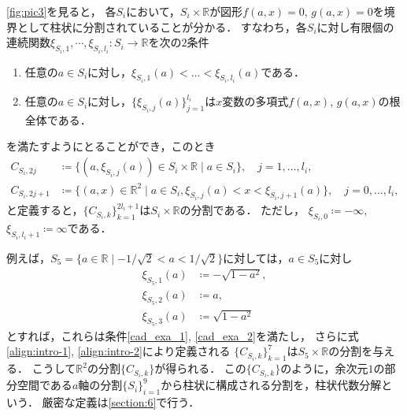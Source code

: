 \documentclass[uplatex, dvipdfmx]{jsarticle}
\numberwithin{equation}{section}
\newcommand{\R}{\mathbb{R}}
\newcommand{\map}[3]{{#1}\colon{#2}\rightarrow{#3}}
\theoremstyle{definition}
\begin{document}
     \cref{fig:pic3}を見ると，
     各$S_i$において，$S_i \times \R$が図形$f(a,x)=0$, $g(a,x)=0$を境界として柱状に分割されていることが分かる．
     すなわち，各$S_i$に対し有限個の連続関数$\map{\xi_{S_i,1}, \cdots, \xi_{S_i,l_i}}{S_i}{\R}$を次の$2$条件
     \begin{enumerate}
          \item 任意の$a \in S_i$に対し，$\xi_{S_i,1}(a) < \dots < \xi_{S_i,l_i}(a)$である．\label{cad_exa_1}
          \item 任意の$a \in S_i$に対し，$\{\xi_{S_i,j}(a)\}_{j=1}^{l_i}$は$x$変数の多項式$f(a,x)$, $g(a,x)$の根全体である．\label{cad_exa_2}
     \end{enumerate}
     を満たすようにとることができ，このとき
     \begin{align}
          \label{align:intro-1} C_{S_i, 2j} &\coloneqq \{(a,\xi_{S_i, j}(a)) \in S_i \times \R \mid a \in S_i\}, \quad j=1,...,l_i,\\
          \label{align:intro-2} C_{S_i, 2j+1} &\coloneqq \{(a,x) \in \R^2 \mid a \in S_i, \xi_{S_i,j}(a) < x < \xi_{S_i, j+1}(a)\}, \quad j=0,...,l_i,
     \end{align}
     と定義すると，$\{C_{S_i,k}\}_{k=1}^{2l_i+1}$は$S_i \times \mathbb{R}$の分割である．
     ただし，
     $\xi_{S_i,0} \coloneqq -\infty$, $\xi_{S_i,l_i+1} \coloneqq \infty$である．


     例えば，$S_5 = \{a \in \R \mid -1/\sqrt{2} < a < 1/\sqrt{2}\}$に対しては，$a \in S_5$に対し
     \begin{align}
          \xi_{S_5,1}(a) &\coloneqq -\sqrt{1-a^2},\\
          \xi_{S_5,2}(a) &\coloneqq a,\\
          \xi_{S_5,3}(a) &\coloneqq \sqrt{1-a^2}
     \end{align}
     とすれば，これらは条件\ref{cad_exa_1}, \ref{cad_exa_2}を満たし，
     さらに式\eqref{align:intro-1}, \eqref{align:intro-2}により定義される
     $\{C_{S_i,k}\}_{k=1}^{7}$は$S_5 \times \R$の分割を与える．
     こうして$\R^2$の分割$\{C_{S_i,k}\}$が得られる．
     この$\{C_{S_i,k}\}$のように，余次元$1$の部分空間である$a$軸の分割$\{S_i\}_{i=1}^9$から柱状に構成される分割を，柱状代数分解という．
     厳密な定義は\cref{section:6}で行う．
\end{document}
